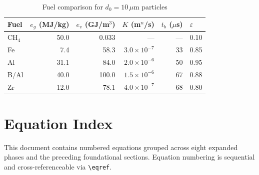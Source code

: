 \documentclass[11pt,a4paper]{article}
\begin{document}
\begin{table}[h]
\centering
\caption{Fuel comparison for $d_0 = 10\,\mu$m particles}
\begin{tabular}{@{}lrrrrl@{}}
\toprule
Fuel & $e_g$ (MJ/kg) & $e_v$ (GJ/m$^3$) & $K$ (m$^n$/s) & $t_b$ ($\mu$s) & $\varepsilon$ \\
\midrule
CH$_4$ & 50.0  & 0.033  & ---         & ---   & 0.10 \\
Fe     &  7.4  & 58.3   & $3.0\!\times\!10^{-7}$ & 33   & 0.85 \\
Al     & 31.1  & 84.0   & $2.0\!\times\!10^{-6}$ & 50   & 0.95 \\
B/Al   & 40.0  & 100.0  & $1.5\!\times\!10^{-6}$ & 67   & 0.88 \\
Zr     & 12.0  & 78.1   & $4.0\!\times\!10^{-7}$ & 68   & 0.80 \\
\bottomrule
\end{tabular}
\end{table}

\section*{Equation Index}

This document contains numbered equations grouped across eight expanded phases
and the preceding foundational sections.  Equation numbering is sequential and
cross-referenceable via \texttt{\textbackslash eqref}.
\end{document}
